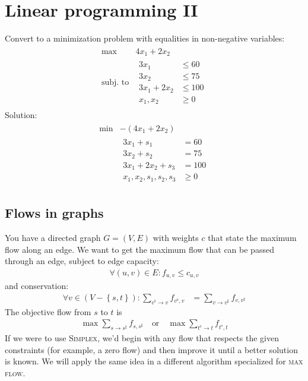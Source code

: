\chapter{Linear programming II}
Convert to a minimization problem with equalities in non-negative variables:
\begin{align}
\begin{matrix}
	\max & 4x_1 + 2x_2 \\
	\text{subj.~to} &\begin{aligned}
		3x_1 &\leq 60 \\
		3x_2 &\leq 75 \\
		3x_1 + 2x_2 &\leq 100 \\
		x_1, x_2 &\geq 0
	\end{aligned}
\end{matrix}
\end{align}
Solution:
\begin{align}
\begin{matrix}
\min & -\left(4x_1 + 2x_2\right)\\
& \begin{aligned}
3x_1 + s_1 &= 60 \\
3x_2 + s_2 &= 75 \\
3x_1 + 2x_2 + s_3 &= 100\\
x_1, x_2, s_1, s_2, s_3 &\geq 0
\end{aligned}
\end{matrix}
\end{align}

\section{Flows in graphs}
You have a directed graph \(G = \left(V, E\right)\) with weights \(c\) that state the maximum flow along an edge.
We want to get the maximum flow that can be passed through an edge, subject to edge capacity:
\begin{align}
\forall (u, v) \in E: f_{u,v} \leq c_{u, v}
\end{align}
and conservation:
\begin{align}
\forall v\in \left(V-\left\{s, t\right\}\right): \sum_{v^\flat\to v} f_{v^\flat,v} &= \sum_{v\to v^\sharp} f_{v, v^\sharp}
\end{align}
The objective flow from \(s\) to \(t\) is
\begin{align}
\max \sum_{s\to s^\sharp} f_{s, s^\sharp} \quad \text{or} \quad \max \sum _{t^\flat \to t} f_{t^\flat, t}
\end{align}
If we were to use \textsc{Simplex}, we'd begin with any flow that respects the given constraints (for example, a zero flow) and then improve it until a better solution is known. We will apply the same idea in a different algorithm specialized for \textsc{max flow}.

